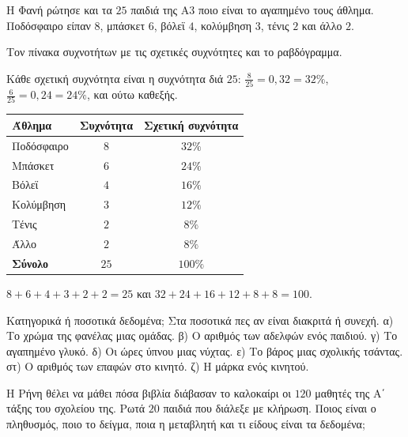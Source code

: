 \tixero Η Φανή ρώτησε και τα $25$ παιδιά της Α$3$ ποιο είναι το αγαπημένο τους άθλημα. Ποδόσφαιρο είπαν $8$, μπάσκετ $6$, βόλεϊ $4$, κολύμβηση $3$, τένις $2$ και άλλο $2$.\par
\tithelo Τον πίνακα συχνοτήτων με τις σχετικές συχνότητες και το ραβδόγραμμα.\par
\possindeo Κάθε σχετική συχνότητα είναι η συχνότητα διά $25$: $\frac{8}{25}=0{,}32=32\%$, $\frac{6}{25}=0{,}24=24\%$, και ούτω καθεξής.\par
\apantisi

\begin{center}
\renewcommand{\arraystretch}{1.25}
\begin{tabular}{lcc}
\toprule
\textbf{Άθλημα} & \textbf{Συχνότητα} & \textbf{Σχετική συχνότητα}\\
\midrule
Ποδόσφαιρο & $8$ & $32\%$\\
Μπάσκετ & $6$ & $24\%$\\
Βόλεϊ & $4$ & $16\%$\\
Κολύμβηση & $3$ & $12\%$\\
Τένις & $2$ & $8\%$\\
Άλλο & $2$ & $8\%$\\
\midrule
\textbf{Σύνολο} & $25$ & $100\%$\\
\bottomrule
\end{tabular}
\end{center}

\begin{center}
\end{center}

\elegxos $8+6+4+3+2+2=25$ και $32+24+16+12+8+8=100$.



\ex Κατηγορικά ή ποσοτικά δεδομένα; Στα ποσοτικά πες αν είναι διακριτά ή συνεχή. α) Το χρώμα της φανέλας μιας ομάδας. β) Ο αριθμός των αδελφών ενός παιδιού. γ) Το αγαπημένο γλυκό. δ) Οι ώρες ύπνου μιας νύχτας. ε) Το βάρος μιας σχολικής τσάντας. στ) Ο αριθμός των επαφών στο κινητό. ζ) Η μάρκα ενός κινητού.

\ex Η Ρήνη θέλει να μάθει πόσα βιβλία διάβασαν το καλοκαίρι οι $120$ μαθητές της Α΄ τάξης του σχολείου της. Ρωτά $20$ παιδιά που διάλεξε με κλήρωση. Ποιος είναι ο πληθυσμός, ποιο το δείγμα, ποια η μεταβλητή και τι είδους είναι τα δεδομένα;

